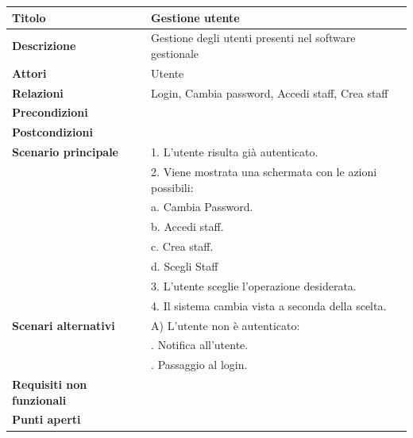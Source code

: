 \documentclass[a4paper]{article}
\begin{document}
\begin{center}
\begin{tabularx}{1\textwidth}{|l|X|}
    \hline
	\textbf{Titolo} & Gestione utente \\
	\hline
	\textbf{Descrizione} & Gestione degli utenti presenti nel software gestionale \\
	\hline
	\textbf{Attori} & Utente \\
	\hline
	\textbf{Relazioni} & Login, Cambia password, Accedi staff, Crea staff \\
	\hline
	\textbf{Precondizioni} &  \\
	\hline
	\textbf{Postcondizioni} &  \\
	\hline
	\textbf{Scenario principale} & 1. L'utente risulta già autenticato.\\
	                             & 2. Viene mostrata una schermata con le azioni possibili:\\
								 & \quad a. Cambia Password.\\
								 & \quad b. Accedi staff.\\
								 & \quad c. Crea staff.\\
								 & \quad d. Scegli Staff\\
								 & 3. L'utente sceglie l'operazione desiderata.\\
								 & 4. Il sistema cambia vista a seconda della scelta.\\
	\hline
	\textbf{Scenari alternativi} & A) L'utente non è autenticato: \\
								 & \quad 1. Notifica all'utente.\\
								 & \quad 2. Passaggio al login.\\
	\hline
	\textbf{Requisiti non funzionali} & \\
	\hline
	\textbf{Punti aperti} & \\
	\hline
\end{tabularx}
\end{center}


\end{document}
